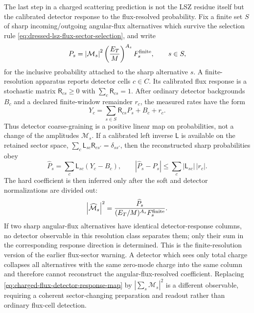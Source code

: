 \begin{controlledapproximation}
\label{ca:charged-flux-cell-detector-response}
The last step in a charged scattering prediction is not the LSZ residue
itself but the calibrated detector response to the flux-resolved probability.
Fix a finite set \(S\) of sharp incoming/outgoing angular-flux alternatives
which survive the selection rule
\eqref{eq:dressed-lsz-flux-sector-selection}, and write
\[
  P_s
  =
  \left|\mathcal M_s\right|^2
  \left(\frac{E_T}{M}\right)^{A_s}
  F_s^{\rm finite},
  \qquad s\in S,
\]
for the inclusive probability attached to the sharp alternative \(s\).  A
finite-resolution apparatus reports detector cells \(c\in C\).  Its calibrated
flux response is a stochastic matrix \(\mathsf R_{cs}\ge0\) with
\(\sum_c\mathsf R_{cs}=1\).  After ordinary detector backgrounds \(B_c\) and a
declared finite-window remainder \(r_c\), the measured rates have the form
\begin{equation}
  Y_c
  =
  \sum_{s\in S}\mathsf R_{cs}P_s
  +
  B_c
  +
  r_c .
  \label{eq:charged-flux-detector-response-map}
\end{equation}
Thus detector coarse-graining is a positive linear map on probabilities, not
a change of the amplitudes \(\mathcal M_s\).  If a calibrated left inverse
\(\mathsf L\) is available on the retained sector space,
\(\sum_c\mathsf L_{sc}\mathsf R_{cs'}=\delta_{ss'}\), then the reconstructed
sharp probabilities obey
\begin{equation}
  \widehat P_s
  =
  \sum_c\mathsf L_{sc}(Y_c-B_c),
  \qquad
  |\widehat P_s-P_s|
  \le
  \sum_c|\mathsf L_{sc}|\,|r_c|.
  \label{eq:charged-flux-detector-inversion-bound}
\end{equation}
The hard coefficient is then inferred only after the soft and detector
normalizations are divided out:
\begin{equation}
  \left|\widehat{\mathcal M}_s\right|^2
  =
  \frac{\widehat P_s}
       {(E_T/M)^{A_s}F_s^{\rm finite}} .
  \label{eq:charged-flux-hard-coefficient-from-detector}
\end{equation}
If two sharp angular-flux alternatives have identical detector-response
columns, no detector observable in this resolution class separates them; only
their sum in the corresponding response direction is determined.  This is
the finite-resolution version of the earlier flux-sector warning.  A detector
which sees only total charge collapses all alternatives with the same
zero-mode charge into the same column and therefore cannot reconstruct the
angular-flux-resolved coefficient.  Replacing
\eqref{eq:charged-flux-detector-response-map} by
\(|\sum_s\mathcal M_s|^2\) is a different observable, requiring a coherent
sector-changing preparation and readout rather than ordinary flux-cell
detection.
\end{controlledapproximation}

